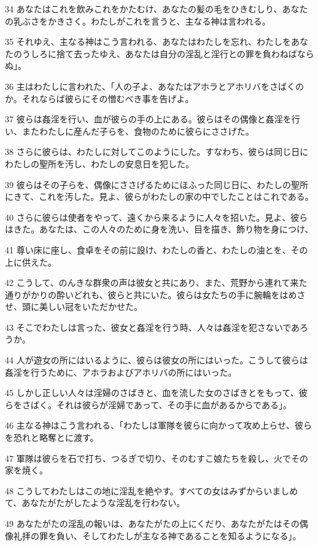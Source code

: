 \par 34 あなたはこれを飲みこれをかたむけ、あなたの髪の毛をひきむしり、あなたの乳ぶさをかきさく。わたしがこれを言うと、主なる神は言われる。
\par 35 それゆえ、主なる神はこう言われる、あなたはわたしを忘れ、わたしをあなたのうしろに捨て去ったゆえ、あなたは自分の淫乱と淫行との罪を負わねばならぬ」。
\par 36 主はわたしに言われた、「人の子よ、あなたはアホラとアホリバをさばくのか。それならば彼らにその憎むべき事を告げよ。
\par 37 彼らは姦淫を行い、血が彼らの手の上にある。彼らはその偶像と姦淫を行い、またわたしに産んだ子らを、食物のために彼らにささげた。
\par 38 さらに彼らは、わたしに対してこのようにした。すなわち、彼らは同じ日にわたしの聖所を汚し、わたしの安息日を犯した。
\par 39 彼らはその子らを、偶像にささげるためにほふった同じ日に、わたしの聖所にきて、これを汚した。見よ、彼らがわたしの家の中でしたことはこれである。
\par 40 さらに彼らは使者をやって、遠くから来るように人々を招いた。見よ、彼らはきた。あなたは、この人々のために身を洗い、目を描き、飾り物を身につけ、
\par 41 尊い床に座し、食卓をその前に設け、わたしの香と、わたしの油とを、その上に供えた。
\par 42 こうして、のんきな群衆の声は彼女と共にあり、また、荒野から連れて来た通りがかりの酔いどれも、彼らと共にいた。彼らは女たちの手に腕輪をはめさせ、頭に美しい冠をいただかせた。
\par 43 そこでわたしは言った、彼女と姦淫を行う時、人々は姦淫を犯さないであろうか。
\par 44 人が遊女の所にはいるように、彼らは彼女の所にはいった。こうして彼らは姦淫を行うために、アホラおよびアホリバの所にはいった。
\par 45 しかし正しい人々は淫婦のさばきと、血を流した女のさばきとをもって、彼らをさばく。それは彼らが淫婦であって、その手に血があるからである」。
\par 46 主なる神はこう言われる、「わたしは軍隊を彼らに向かって攻め上らせ、彼らを恐れと略奪とに渡す。
\par 47 軍隊は彼らを石で打ち、つるぎで切り、そのむすこ娘たちを殺し、火でその家を焼く。
\par 48 こうしてわたしはこの地に淫乱を絶やす。すべての女はみずからいましめて、あなたがたがしたような淫乱を行わない。
\par 49 あなたがたの淫乱の報いは、あなたがたの上にくだり、あなたがたはその偶像礼拝の罪を負い、そしてわたしが主なる神であることを知るようになる」。

